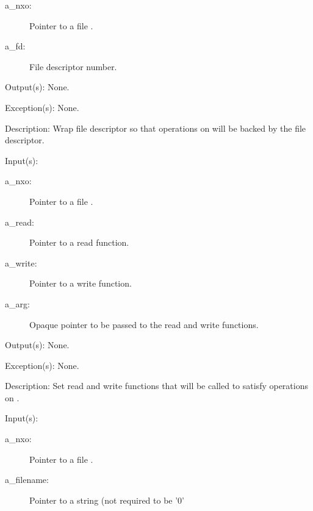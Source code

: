 \begin{capi}
\begin{capilist}
		\begin{description}\item[]
		\item[a\_nxo: ]
			Pointer to a file .
		\item[a\_fd: ]
			File descriptor number.
		\end{description}
	\item[Output(s): ] None.
	\item[Exception(s): ] None.
	\item[Description: ]
		Wrap file descriptor  so that operations on
		 will be backed by the file descriptor.
	\end{capilist}
\label{nxo_file_interactive}
	\begin{capilist}
	\item[Input(s): ]
		\begin{description}\item[]
		\item[a\_nxo: ]
			Pointer to a file .
		\item[a\_read: ]
			Pointer to a read function.
		\item[a\_write: ]
			Pointer to a write function.
		\item[a\_arg: ]
			Opaque pointer to be passed to the read and write
			functions.
		\end{description}
	\item[Output(s): ] None.
	\item[Exception(s): ] None.
	\item[Description: ]
		Set read and write functions that will be called to satisfy
		operations on .
	\end{capilist}
\label{nxo_file_open}
	\begin{capilist}
	\item[Input(s): ]
		\begin{description}\item[]
		\item[a\_nxo: ]
			Pointer to a file \classname{nxo}.
		\item[a\_filename: ]
			Pointer to a string (not required to be '{\bs}0'

\end{description}
\end{capilist}
\end{capi}
